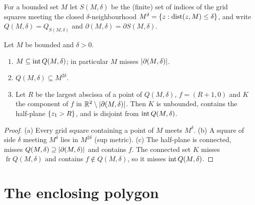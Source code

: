 
For a bounded set $M$ let $S(M,\delta)$ be the (finite) set of indices of the grid squares meeting
the closed $\delta$-neighbourhood $M^{\delta}=\left\{ z:\operatorname{dist}(z,M)\le\delta \right\}$, and write
$Q(M,\delta)=Q_{S(M,\delta)}$ and $\partial(M,\delta)=\partial S(M,\delta)$.

\begin{lemma}\label{lem:grid-union}
Let $M$ be bounded and $\delta>0$.
\begin{enumerate}[label=(\alph*)]
\item $M\subseteq\operatorname{int} Q(M,\delta)$; in particular $M$ misses $\lvert \partial(M,\delta)\rvert$.
\item $Q(M,\delta)\subseteq M^{2\delta}$.
\item Let $R$ be the largest abscissa of a point of $Q(M,\delta)$, $f=(R+1,0)$ and $K$ the component
of $f$ in $\mathbb{R}^2\setminus\lvert \partial(M,\delta)\rvert$. Then $K$ is unbounded, contains the half-plane
$\left\{ z_1>R \right\}$, and is disjoint from $\operatorname{int} Q(M,\delta)$.
\end{enumerate}
\end{lemma}

\begin{proof}
(a) Every grid square containing a point of $M$ meets $M^\delta$. (b) A square of side $\delta$
meeting $M^\delta$ lies in $M^{2\delta}$ (sup metric). (c) The half-plane is connected, misses
$Q(M,\delta)\supseteq\lvert \partial(M,\delta)\rvert$ and contains $f$. The connected set $K$ misses
$\operatorname{fr}Q(M,\delta)$ and contains $f\notin Q(M,\delta)$, so it misses $\operatorname{int}
Q(M,\delta)$.
\end{proof}


\section{The enclosing polygon}

